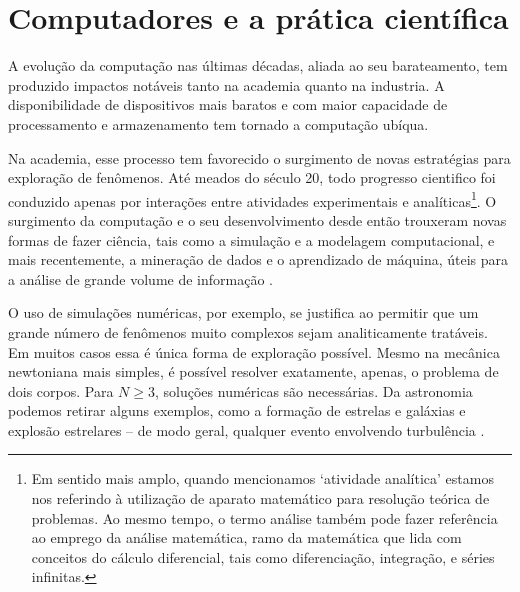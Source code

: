 \chapter{Computadores e a prática científica}\label{computadores-e-ciencia}




A evolução da computação nas últimas décadas, aliada ao seu barateamento, tem produzido impactos notáveis tanto na academia quanto na industria. A disponibilidade de dispositivos mais baratos e com maior capacidade de processamento e armazenamento tem tornado a computação ubíqua. 


Na academia, esse processo tem favorecido o surgimento de novas estratégias para exploração de fenômenos. Até meados do século 20, todo progresso cientifico foi conduzido apenas por interações entre atividades experimentais e analíticas\footnote{
Em sentido mais amplo, quando mencionamos `atividade analítica' estamos nos referindo à utilização de aparato matemático para resolução teórica de problemas. Ao mesmo tempo, o termo análise também pode fazer referência ao emprego da análise matemática, ramo da matemática que lida com conceitos do cálculo diferencial, tais como diferenciação, integração, e séries infinitas.}. O surgimento da computação e o seu desenvolvimento desde então trouxeram novas formas de fazer ciência, tais como a simulação e a modelagem computacional, e mais recentemente, a mineração de dados e o aprendizado de máquina, úteis para a análise de grande volume de informação \cite{Djorgovski2005, wing2006}. %


O uso de simulações numéricas, por exemplo, se justifica ao permitir que um grande número de fenômenos muito complexos sejam analiticamente tratáveis. Em muitos casos essa é única forma de exploração possível. Mesmo na mecânica newtoniana mais simples, é possível resolver  exatamente, apenas, o problema de dois corpos. Para $N\geq3$, soluções numéricas são necessárias. Da astronomia podemos retirar alguns exemplos, como a formação de estrelas e galáxias e explosão estrelares -- de modo geral, qualquer evento envolvendo turbulência  \cite[]{Djorgovski2005}. %

